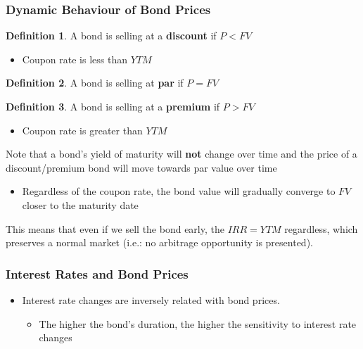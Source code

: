 \documentclass[11pt]{article}
\theoremstyle{definition}
\newtheorem*{definition}{Definition}
\begin{document}
\subsubsection{Dynamic Behaviour of Bond Prices}
\begin{definition}
    A bond is selling at a \textbf{discount} if $P < FV$
    \begin{itemize}
        \item Coupon rate is less than $YTM$
    \end{itemize}
\end{definition}
\begin{definition}
    A bond is selling at \textbf{par} if $P = FV$
\end{definition}
\begin{definition}
    A bond is selling at a \textbf{premium} if $P > FV$
    \begin{itemize}
        \item Coupon rate is greater than $YTM$
    \end{itemize}
\end{definition}
Note that a bond's yield of maturity will \textbf{not} change over time and the price of a discount/premium bond will move towards par value over time 
\begin{itemize}
    \item Regardless of the coupon rate, the bond value will gradually converge to $FV$ closer to the maturity date
\end{itemize}
This means that even if we sell the bond early, the $IRR = YTM$ regardless, which preserves a normal market (i.e.: no arbitrage opportunity is presented).

\subsubsection{Interest Rates and Bond Prices}
\begin{itemize}
    \item Interest rate changes are inversely related with bond prices.
    \begin{itemize}
        \item The higher the bond's duration, the higher the sensitivity to interest rate changes
    \end{itemize}
\end{itemize}
\end{document}
